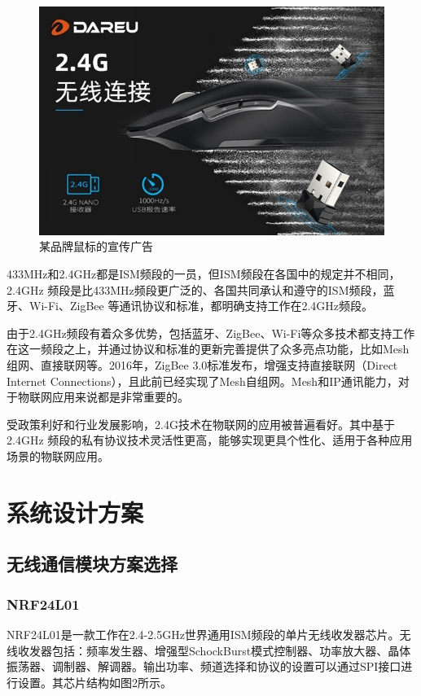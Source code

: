 \documentclass[UTF8,a4paper,11pt]{article}
\begin{document}
\begin{figure}[htbp]
    \centering
    \includegraphics[scale=0.4]{mouse.jpg}
    \caption{某品牌鼠标的宣传广告}
\end{figure} 

433MHz和2.4GHz都是ISM频段的一员，但ISM频段在各国中的规定并不相同，2.4GHz 频段是比433MHz频段更广泛的、各国共同承认和遵守的ISM频段，蓝牙、Wi-Fi、ZigBee 等通讯协议和标准，都明确支持工作在2.4GHz频段。

由于2.4GHz频段有着众多优势，包括蓝牙、ZigBee、Wi-Fi等众多技术都支持工作在这一频段之上，并通过协议和标准的更新完善提供了众多亮点功能，比如Mesh组网、直接联网等。2016年，ZigBee 3.0标准发布，增强支持直接联网（Direct Internet Connections），且此前已经实现了Mesh自组网。Mesh和IP通讯能力，对于物联网应用来说都是非常重要的。

受政策利好和行业发展影响，2.4G技术在物联网的应用被普遍看好。其中基于2.4GHz 频段的私有协议技术灵活性更高，能够实现更具个性化、适用于各种应用场景的物联网应用。
\clearpage

\section{系统设计方案}
\subsection{无线通信模块方案选择}
\subsubsection{NRF24L01}
NRF24L01是一款工作在2.4-2.5GHz世界通用ISM频段的单片无线收发器芯片。无线收发器包括：频率发生器、增强型SchockBurst模式控制器、功率放大器、晶体振荡器、调制器、解调器。输出功率、频道选择和协议的设置可以通过SPI接口进行设置。其芯片结构如图2所示。
\end{document}
